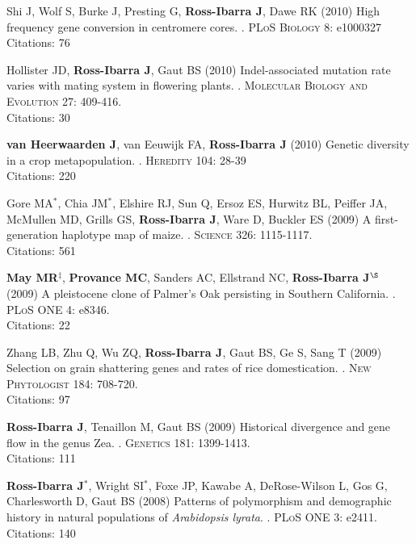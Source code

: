 \documentclass[letterpaper,10pt]{article}
\begin{document}
\begin{etaremune}
\item Shi J, Wolf S, Burke J, Presting G, {\bf Ross-Ibarra J}, Dawe RK (2010) High frequency gene conversion in centromere cores. . \textsc{PLoS Biology} 8: e1000327
\\Citations: 76\\


\item Hollister JD, {\bf Ross-Ibarra J}, Gaut BS (2010) Indel-associated mutation rate varies with mating system in flowering plants. . \textsc{Molecular Biology and Evolution} 27: 409-416.
\\Citations: 30\\

\item {\bf van Heerwaarden J}, van Eeuwijk FA, {\bf Ross-Ibarra J} (2010) Genetic diversity in a crop metapopulation. . \textsc{Heredity} 104: 28-39
\\Citations: 220\\


\item Gore MA$^*$, Chia JM$^*$, Elshire RJ, Sun Q, Ersoz ES, Hurwitz BL, Peiffer JA, McMullen MD, Grills GS, {\bf Ross-Ibarra J}, Ware D, Buckler ES (2009) A first-generation haplotype map of maize. . \textsc{Science 326}: 1115-1117.
\\Citations: 561\\


\item {\bf May MR}$^\ddagger$, {\bf Provance MC}, Sanders AC, Ellstrand NC, {\bf Ross-Ibarra J}$^\S$ (2009) A pleistocene clone of Palmer's Oak persisting in Southern California. . \textsc{PLoS ONE} 4: e8346.
\\Citations: 22\\


\item Zhang LB, Zhu Q, Wu ZQ, {\bf Ross-Ibarra J}, Gaut BS, Ge S, Sang T (2009) Selection on grain shattering genes and rates of rice domestication. . \textsc{New Phytologist} 184: 708-720.
\\Citations: 97\\
\item {\bf Ross-Ibarra J}, Tenaillon M, Gaut BS (2009) Historical divergence and gene flow in the genus Zea. . \textsc{Genetics} 181: 1399-1413.
\\Citations: 111\\


\item {\bf Ross-Ibarra J}$^*$, Wright SI$^*$, Foxe JP, Kawabe A, DeRose-Wilson L, Gos G, Charlesworth D, Gaut BS (2008) Patterns of polymorphism and demographic history in natural populations of \emph{Arabidopsis lyrata}. . \textsc{PLoS ONE} 3: e2411.
\\Citations: 140\\



\end{etaremune}
\end{document}
